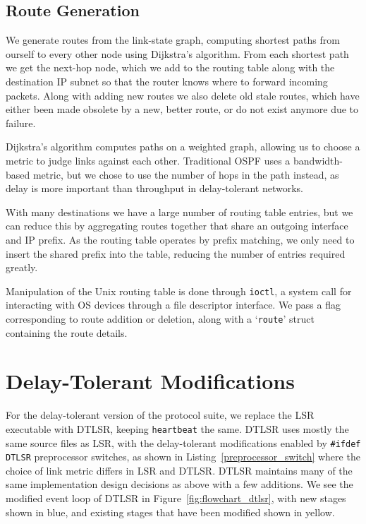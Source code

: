 \documentclass[withindex,glossary,openany]{cam-thesis}
\begin{document}
\subsection{Route Generation}

We generate routes from the link-state graph, computing shortest paths from ourself to every other node using Dijkstra's algorithm. From each shortest path we get the next-hop node, which we add to the routing table along with the destination IP subnet so that the router knows where to forward incoming packets. Along with adding new routes we also delete old stale routes, which have either been made obsolete by a new, better route, or do not exist anymore due to failure.

Dijkstra's algorithm computes paths on a weighted graph, allowing us to choose a metric to judge links against each other. Traditional OSPF uses a bandwidth-based metric, but we chose to use the number of hops in the path instead, as delay is more important than throughput in delay-tolerant networks.

With many destinations we have a large number of routing table entries, but we can reduce this by aggregating routes together that share an outgoing interface and IP prefix. As the routing table operates by prefix matching, we only need to insert the shared prefix into the table, reducing the number of entries required greatly.

Manipulation of the Unix routing table is done through \texttt{ioctl}, a system call for interacting with OS devices through a file descriptor interface. We pass a flag corresponding to route addition or deletion, along with a `\texttt{route}' struct containing the route details.

\section{Delay-Tolerant Modifications}
\label{sec:dtlsr_design}

For the delay-tolerant version of the protocol suite, we replace the LSR executable with DTLSR, keeping \texttt{heartbeat} the same. DTLSR uses mostly the same source files as LSR, with the delay-tolerant modifications enabled by \texttt{\#ifdef DTLSR} preprocessor switches, as shown in Listing~\ref{preprocessor_switch} where the choice of link metric differs in LSR and DTLSR. DTLSR maintains many of the same implementation design decisions as above with a few additions. We see the modified event loop of DTLSR in Figure~\ref{fig:flowchart_dtlsr}, with new stages shown in blue, and existing stages that have been modified shown in yellow.
\end{document}
